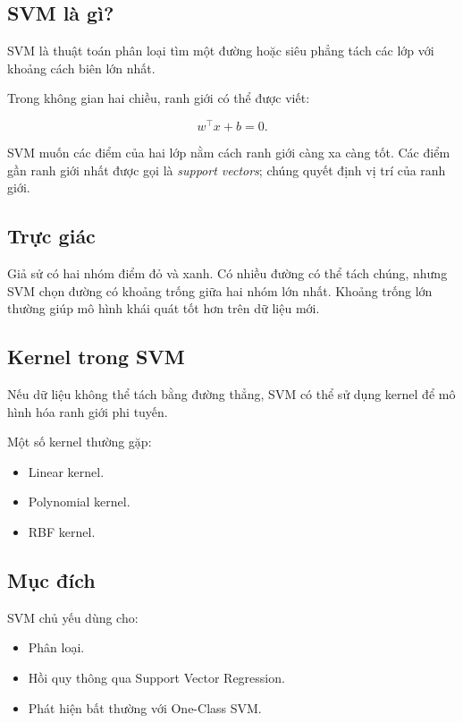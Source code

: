 \documentclass[12pt,a4paper]{report}
\begin{document}
\subsection{SVM là gì?}

SVM là thuật toán phân loại tìm một đường hoặc siêu phẳng tách các lớp với khoảng cách biên lớn nhất.

Trong không gian hai chiều, ranh giới có thể được viết:

\begin{equation}
w^\top x+b=0.
\end{equation}

SVM muốn các điểm của hai lớp nằm cách ranh giới càng xa càng tốt. Các điểm gần ranh giới nhất được gọi là \textit{support vectors}; chúng quyết định vị trí của ranh giới.

\subsection{Trực giác}

Giả sử có hai nhóm điểm đỏ và xanh. Có nhiều đường có thể tách chúng, nhưng SVM chọn đường có khoảng trống giữa hai nhóm lớn nhất. Khoảng trống lớn thường giúp mô hình khái quát tốt hơn trên dữ liệu mới.

\subsection{Kernel trong SVM}

Nếu dữ liệu không thể tách bằng đường thẳng, SVM có thể sử dụng kernel để mô hình hóa ranh giới phi tuyến.

Một số kernel thường gặp:

\begin{itemize}[leftmargin=1.5em]
    \item Linear kernel.
    \item Polynomial kernel.
    \item RBF kernel.
\end{itemize}

\subsection{Mục đích}

SVM chủ yếu dùng cho:

\begin{itemize}[leftmargin=1.5em]
    \item Phân loại.
    \item Hồi quy thông qua Support Vector Regression.
    \item Phát hiện bất thường với One-Class SVM.
\end{itemize}
\end{document}
